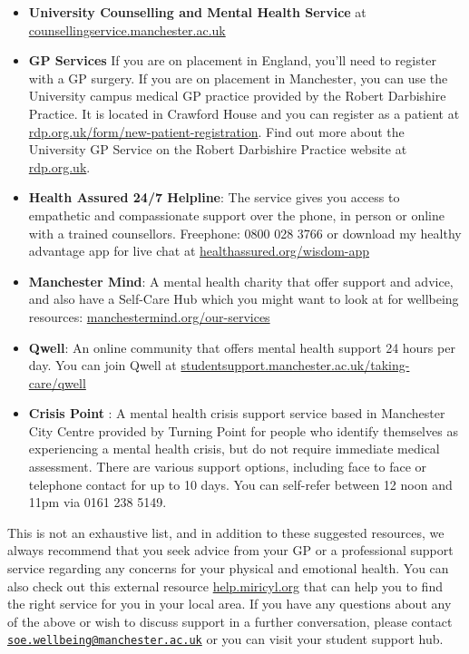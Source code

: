 \documentclass[
]{book}
\providecommand{\tightlist}{%
  \setlength{\itemsep}{0pt}\setlength{\parskip}{0pt}}
\begin{document}
\begin{itemize}
\tightlist
\item
  \textbf{University Counselling and Mental Health Service} at \href{https://www.counsellingservice.manchester.ac.uk/}{counsellingservice.manchester.ac.uk} \citep{counselling}
\item
  \textbf{GP Services} If you are on placement in England, you'll need to register with a GP surgery. \citep{registerNHS} If you are on placement in Manchester, you can use the University campus medical GP practice provided by the Robert Darbishire Practice. It is located in Crawford House and you can register as a patient at \href{https://rdp.org.uk/form/new-patient-registration/}{rdp.org.uk/form/new-patient-registration}. Find out more about the University GP Service on the Robert Darbishire Practice website at \href{https://rdp.org.uk}{rdp.org.uk}.\citep{darbishire}
\item
  \textbf{Health Assured 24/7 Helpline}: The service gives you access to empathetic and compassionate support over the phone, in person or online with a trained counsellors. Freephone: 0800 028 3766 or download my healthy advantage app for live chat at \href{https://www.healthassured.org/wisdom-app/}{healthassured.org/wisdom-app}
\item
  \textbf{Manchester Mind}: A mental health charity that offer support and advice, and also have a Self-Care Hub which you might want to look at for wellbeing resources: \href{https://www.manchestermind.org/our-services/}{manchestermind.org/our-services} \citep{manchestermind}
\item
  \textbf{Qwell}: An online community that offers mental health support 24 hours per day. You can join Qwell
  at \href{https://www.studentsupport.manchester.ac.uk/taking-care/qwell/}{studentsupport.manchester.ac.uk/taking-care/qwell} \citep{qwell}
\item
  \textbf{Crisis Point} : A mental health crisis support service based in Manchester City Centre provided by Turning Point for people who identify themselves as experiencing a mental health crisis, but do not require immediate medical assessment. There are various support options, including face to face or telephone contact for up to 10 days. You can self-refer between 12 noon and 11pm via 0161 238 5149.
\end{itemize}

This is not an exhaustive list, and in addition to these suggested resources, we always recommend that you seek advice from your GP or a professional support service regarding any concerns for your physical and emotional health. You can also check out this external resource \href{https://help.miricyl.org}{help.miricyl.org} that can help you to find the right service for you in your local area. If you have any questions about any of the above or wish to discuss support in a further conversation, please
contact \href{mailto:soe.wellbeing@manchester.ac.uk}{\nolinkurl{soe.wellbeing@manchester.ac.uk}} or you can visit your student support hub.
\end{document}
